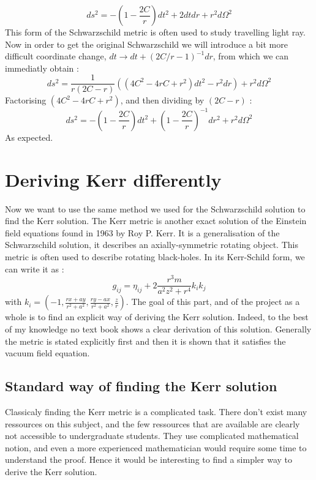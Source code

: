 \documentclass[a4paper,12pt]{article}
\theoremstyle{definition}
\begin{document}
\begin{equation}
	ds^2=-(1-\frac{2C}{r})dt^2+2dtdr+r^2d\Omega^2
\end{equation}
This form of the Schwarzschild metric is often used to study travelling light ray.
Now in order to get the original Schwarzschild we will introduce a bit more difficult coordinate change, $dt\rightarrow dt+(2C/r-1)^{-1}dr$, from which we can immediatly obtain :
\begin{equation}
	ds^2=\frac{1}{r(2C-r)}((4C^2-4rC+r^2)dt^2-r^2dr)+r^2d\Omega^2
\end{equation}
Factorising $(4C^2-4rC+r^2)$, and then dividing by $(2C-r)$ :
\begin{equation}
	ds^2=-(1-\frac{2C}{r})dt^2+(1-\frac{2C}{r})^{-1}dr^2+r^2d\Omega^2
\end{equation}
As expected.

\section{Deriving Kerr differently}
Now we want to use the same method we used for the Schwarzschild solution to find the Kerr solution.
The Kerr metric is another exact solution of the Einstein field equations found in 1963 by Roy P. Kerr.
It is a generalisation of the Schwarzschild solution, it describes an axially-symmetric rotating object.
This metric is often used to describe rotating black-holes.
In its Kerr-Schild form, we can write it as :
\begin{equation}
	g_{ij}=\eta_{ij}+2\frac{r^3m}{a^2 z^2+r^4}k_ik_j
\end{equation}
with $k_i=(-1,\frac{r x + a y}{r^2 + a^2},\frac{ry-ax}{r^2+a^2},\frac{z}{r})$.
The goal of this part, and of the project as a whole is to find an explicit way of deriving the Kerr solution.
Indeed, to the best of my knowledge no text book shows a clear derivation of this solution.
Generally the metric is stated explicitly first and then it is shown that it satisfies the vacuum field equation.
\subsection{Standard way of finding the Kerr solution}
Classicaly finding the Kerr metric is a complicated task.
There don't exist many ressources on this subject, and the few ressources that are available are clearly not accessible to undergraduate students.
They use complicated mathematical notion, and even a more experienced mathematician would require some time to understand the proof.
Hence it would be interesting to find a simpler way to derive the Kerr solution.
\end{document}
